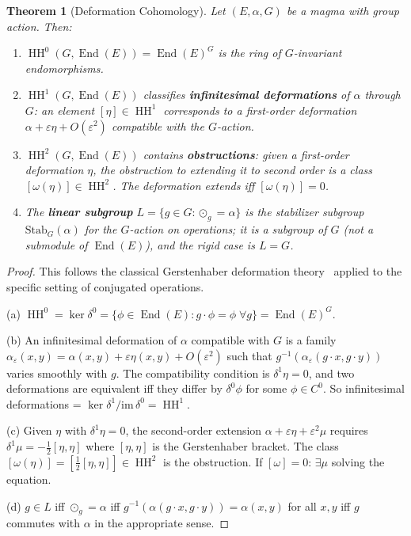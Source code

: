 \documentclass[11pt,twocolumn]{article}
\theoremstyle{plain}\newtheorem{theorem}{Theorem}\newtheorem{proposition}[theorem]{Proposition}\newtheorem{corollary}[theorem]{Corollary}\newtheorem{lemma}[theorem]{Lemma}
\theoremstyle{definition}\newtheorem{definition}[theorem]{Definition}\newtheorem{example}[theorem]{Example}
\theoremstyle{remark}\newtheorem{remark}[theorem]{Remark}
\newcommand{\HH}{\operatorname{HH}}
\newcommand{\End}{\operatorname{End}}
\begin{document}
\begin{theorem}[Deformation Cohomology]\label{thm:cohom}
Let $(E, \alpha, G)$ be a magma with group action. Then:
\begin{enumerate}[label=(\alph*)]
    \item $\HH^0(G, \End(E)) = \End(E)^G$ is the ring of $G$-invariant endomorphisms.
    \item $\HH^1(G, \End(E))$ classifies \textbf{infinitesimal deformations} of $\alpha$ through $G$: an element $[\eta] \in \HH^1$ corresponds to a first-order deformation $\alpha + \varepsilon\eta + O(\varepsilon^2)$ compatible with the $G$-action.
    \item $\HH^2(G, \End(E))$ contains \textbf{obstructions}: given a first-order deformation $\eta$, the obstruction to extending it to second order is a class $[\omega(\eta)] \in \HH^2$. The deformation extends iff $[\omega(\eta)] = 0$.
    \item The \textbf{linear subgroup} $L = \{g \in G : \odot_g = \alpha\}$ is the stabilizer subgroup $\mathrm{Stab}_G(\alpha)$ for the $G$-action on operations; it is a subgroup of $G$ (not a submodule of $\End(E)$), and the rigid case is $L = G$.
\end{enumerate}
\end{theorem}

\begin{proof}
This follows the classical Gerstenhaber deformation theory~\cite{gerstenhaber1964} applied to the specific setting of conjugated operations.

(a) $\HH^0 = \ker\delta^0 = \{\phi \in \End(E) : g \cdot \phi = \phi \;\forall g\} = \End(E)^G$.

(b) An infinitesimal deformation of $\alpha$ compatible with $G$ is a family $\alpha_\varepsilon(x,y) = \alpha(x,y) + \varepsilon\eta(x,y) + O(\varepsilon^2)$ such that $g^{-1}(\alpha_\varepsilon(g \cdot x, g \cdot y))$ varies smoothly with $g$. The compatibility condition is $\delta^1\eta = 0$, and two deformations are equivalent iff they differ by $\delta^0\phi$ for some $\phi \in C^0$. So infinitesimal deformations = $\ker\delta^1/\mathrm{im}\,\delta^0 = \HH^1$.

(c) Given $\eta$ with $\delta^1\eta = 0$, the second-order extension $\alpha + \varepsilon\eta + \varepsilon^2\mu$ requires $\delta^1\mu = -\frac{1}{2}[\eta, \eta]$ where $[\eta, \eta]$ is the Gerstenhaber bracket. The class $[\omega(\eta)] = [\frac{1}{2}[\eta,\eta]] \in \HH^2$ is the obstruction. If $[\omega] = 0$: $\exists \mu$ solving the equation.

(d) $g \in L$ iff $\odot_g = \alpha$ iff $g^{-1}(\alpha(g \cdot x, g \cdot y)) = \alpha(x,y)$ for all $x,y$ iff $g$ commutes with $\alpha$ in the appropriate sense.
\end{proof}
\end{document}
